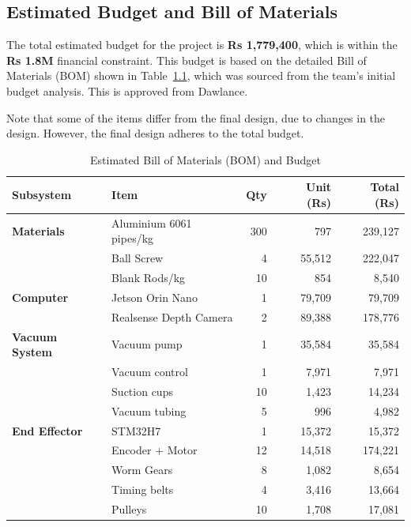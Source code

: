 \begin{appendices}
\chapter{Estimated Budget and Bill of Materials}
\label{sec:budget}

The total estimated budget for the project is \textbf{Rs 1,779,400}, which is within the \textbf{Rs 1.8M} financial constraint. This budget is based on the detailed Bill of Materials (BOM) shown in Table~\ref{tab:bom}, which was sourced from the team's initial budget analysis. This is approved from Dawlance.

Note that some of the items differ from the final design, due to changes in the design. However, the final design adheres to the  total budget.

\renewcommand{\arraystretch}{0.9} %
\begin{table}[H]
  \centering
  \caption{Estimated Bill of Materials (BOM) and Budget}
  \label{tab:bom}
  \begin{tabular}{@{}l l r r r@{}}
    \toprule
    \textbf{Subsystem} & \textbf{Item} & \textbf{Qty} & \textbf{Unit (Rs)} & \textbf{Total (Rs)} \\
    \midrule
    \textbf{Materials} & Aluminium 6061 pipes/kg & 300 & 797 & 239,127 \\
     & Ball Screw & 4 & 55,512 & 222,047 \\
     & Blank Rods/kg & 10 & 854 & 8,540 \\
    \addlinespace
    \textbf{Computer} & Jetson Orin Nano & 1 & 79,709 & 79,709 \\
     & Realsense Depth Camera & 2 & 89,388 & 178,776 \\
    \addlinespace
    \textbf{Vacuum System} & Vacuum pump & 1 & 35,584 & 35,584 \\
     & Vacuum control & 1 & 7,971 & 7,971 \\
     & Suction cups & 10 & 1,423 & 14,234 \\
     & Vacuum tubing & 5 & 996 & 4,982 \\
    \addlinespace
    \textbf{End Effector} & STM32H7 & 1 & 15,372 & 15,372 \\
     & Encoder + Motor & 12 & 14,518 & 174,221 \\
     & Worm Gears & 8 & 1,082 & 8,654 \\
     & Timing belts & 4 & 3,416 & 13,664 \\
     & Pulleys & 10 & 1,708 & 17,081 \\

\end{tabular}
\end{table}
\end{appendices}
